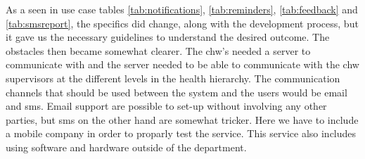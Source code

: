 As a seen in use case tables \ref{tab:notifications}, \ref{tab:reminders}, \ref{tab:feedback} and \ref{tab:smsreport}, the specifics did change, along with the development process, but it gave us the necessary guidelines to understand the desired outcome.
The obstacles then became somewhat clearer. The \gls{chw}'s needed a server to communicate with and the server needed to be able to communicate with the \gls{chw} supervisors at the different levels in the health hierarchy.
The communication channels that should be used between the system and the users would be email and \gls{sms}. Email support are possible to set-up without involving any other parties, but \gls{sms} on the other hand are somewhat tricker. Here we have to include a mobile company in order to proparly test the service. This service also includes using software and hardware outside of the department.


